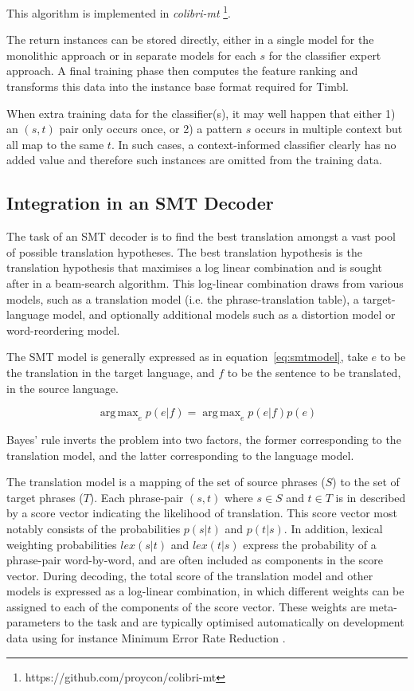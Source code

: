 \documentclass[smallextended]{svjour3}       %
\theoremstyle{break}
\DeclareMathOperator*{\argmax}{arg\,max}
\begin{document}
This algorithm is implemented in \emph{colibri-mt}
\footnote{https://github.com/proycon/colibri-mt}.

The return instances can be stored directly, either in a single model for the
monolithic approach or in separate models for each $s$ for the classifier
expert approach. A final training phase then computes the feature ranking and
transforms this data into the instance base format required for Timbl.

When extra training data for the classifier(s), it may well happen that either
1) an $(s,t)$ pair only occurs once, or 2) a pattern $s$ occurs in multiple
context but all map to the same $t$. In such cases, a context-informed
classifier clearly has no added value and therefore such instances are omitted from the training data.  

\subsection{Integration in an SMT Decoder}
\label{sec:smtintegration}

The task of an SMT decoder is to find the best translation amongst a vast pool
of possible translation hypotheses. The best translation hypothesis is the
translation hypothesis that maximises a log linear combination and is sought
after in a beam-search algorithm. This log-linear combination draws from
various models, such as a translation model (i.e. the phrase-translation
table), a target-language model, and optionally additional models such as a
distortion model or word-reordering model. 

The SMT model is generally expressed as in equation~\ref{eq:smtmodel}, take $e$
to be the translation in the target language, and $f$ to be the sentence to be
translated, in the source language.

\begin{equation}
\argmax_e p(e|f) = \argmax_e p(e|f)p(e)
\label{eq:smtmodel}
\end{equation}

Bayes' rule inverts the problem into two factors, the former corresponding to
the translation model, and the latter corresponding to the language model. 

The translation model is a mapping of the set of source phrases ($S$) to the
set of target phrases ($T$). Each phrase-pair $(s,t)$ where $s \in S$ and $t
\in T$ is in described by a score vector indicating the likelihood of
translation. This score vector most notably consists of the probabilities
$p(s|t)$ and $p(t|s)$. In addition, lexical weighting probabilities $lex(s|t)$
and $lex(t|s)$ express the probability of a phrase-pair word-by-word, and are
often included as components in the score vector. During decoding, the total
score of the translation model and other models is expressed as a log-linear
combination, in which different weights can be assigned to each of the
components of the score vector. These weights are meta-parameters to the task and
are typically optimised automatically on development data using for instance
Minimum Error Rate Reduction \citep{MERT}.
\end{document}
